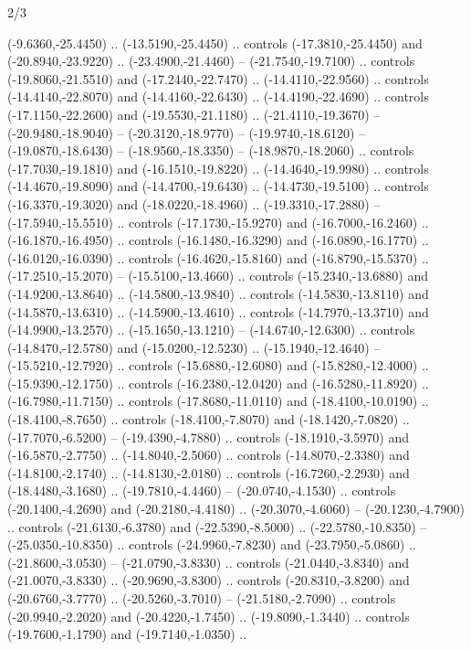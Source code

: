 \begin{flagdescription}{2/3}
\begin{scope}[xshift=0.5\flaglength,yshift=0.5\flagwidth,scale=\flagwidth/480]
\begin{scope}[y=0.80pt, x=0.80pt, yscale=-1,shift={(-450,-300)}]
  (-9.6360,-25.4450) .. (-13.5190,-25.4450) .. controls (-17.3810,-25.4450) and
  (-20.8940,-23.9220) .. (-23.4900,-21.4460) -- (-21.7540,-19.7100) .. controls
  (-19.8060,-21.5510) and (-17.2440,-22.7470) .. (-14.4110,-22.9560) .. controls
  (-14.4140,-22.8070) and (-14.4160,-22.6430) .. (-14.4190,-22.4690) .. controls
  (-17.1150,-22.2600) and (-19.5530,-21.1180) .. (-21.4110,-19.3670) --
  (-20.9480,-18.9040) -- (-20.3120,-18.9770) -- (-19.9740,-18.6120) --
  (-19.0870,-18.6430) -- (-18.9560,-18.3350) -- (-18.9870,-18.2060) .. controls
  (-17.7030,-19.1810) and (-16.1510,-19.8220) .. (-14.4640,-19.9980) .. controls
  (-14.4670,-19.8090) and (-14.4700,-19.6430) .. (-14.4730,-19.5100) .. controls
  (-16.3370,-19.3020) and (-18.0220,-18.4960) .. (-19.3310,-17.2880) --
  (-17.5940,-15.5510) .. controls (-17.1730,-15.9270) and (-16.7000,-16.2460) ..
  (-16.1870,-16.4950) .. controls (-16.1480,-16.3290) and (-16.0890,-16.1770) ..
  (-16.0120,-16.0390) .. controls (-16.4620,-15.8160) and (-16.8790,-15.5370) ..
  (-17.2510,-15.2070) -- (-15.5100,-13.4660) .. controls (-15.2340,-13.6880) and
  (-14.9200,-13.8640) .. (-14.5800,-13.9840) .. controls (-14.5830,-13.8110) and
  (-14.5870,-13.6310) .. (-14.5900,-13.4610) .. controls (-14.7970,-13.3710) and
  (-14.9900,-13.2570) .. (-15.1650,-13.1210) -- (-14.6740,-12.6300) .. controls
  (-14.8470,-12.5780) and (-15.0200,-12.5230) .. (-15.1940,-12.4640) --
  (-15.5210,-12.7920) .. controls (-15.6880,-12.6080) and (-15.8280,-12.4000) ..
  (-15.9390,-12.1750) .. controls (-16.2380,-12.0420) and (-16.5280,-11.8920) ..
  (-16.7980,-11.7150) .. controls (-17.8680,-11.0110) and (-18.4100,-10.0190) ..
  (-18.4100,-8.7650) .. controls (-18.4100,-7.8070) and (-18.1420,-7.0820) ..
  (-17.7070,-6.5200) -- (-19.4390,-4.7880) .. controls (-18.1910,-3.5970) and
  (-16.5870,-2.7750) .. (-14.8040,-2.5060) .. controls (-14.8070,-2.3380) and
  (-14.8100,-2.1740) .. (-14.8130,-2.0180) .. controls (-16.7260,-2.2930) and
  (-18.4480,-3.1680) .. (-19.7810,-4.4460) -- (-20.0740,-4.1530) .. controls
  (-20.1400,-4.2690) and (-20.2180,-4.4180) .. (-20.3070,-4.6060) --
  (-20.1230,-4.7900) .. controls (-21.6130,-6.3780) and (-22.5390,-8.5000) ..
  (-22.5780,-10.8350) -- (-25.0350,-10.8350) .. controls (-24.9960,-7.8230) and
  (-23.7950,-5.0860) .. (-21.8600,-3.0530) -- (-21.0790,-3.8330) .. controls
  (-21.0440,-3.8340) and (-21.0070,-3.8330) .. (-20.9690,-3.8300) .. controls
  (-20.8310,-3.8200) and (-20.6760,-3.7770) .. (-20.5260,-3.7010) --
  (-21.5180,-2.7090) .. controls (-20.9940,-2.2020) and (-20.4220,-1.7450) ..
  (-19.8090,-1.3440) .. controls (-19.7600,-1.1790) and (-19.7140,-1.0350) ..

\end{scope}
\end{scope}
\end{flagdescription}
